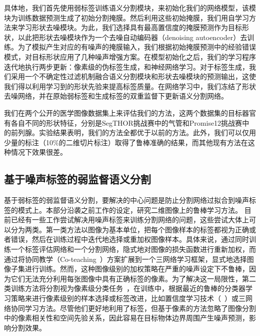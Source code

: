 具体地，我们首先使用弱标签训练语义分割模块，来初始化我们的网络模型，该模块为训练数据预测生成了初始分割掩膜。然后利用这些初始掩膜，我们用自学习方法来学习形状去噪模块。为此，我们选择具有最高置信度的掩膜预测作为目标形状，以此把形状去噪模块作为一个去噪自动编码器（denoising autoencoder）去训练\citep{vincent2010stacked,Sundermeyer_2018_ECCV}。为了模拟产生对应的有噪声的掩膜输入，我们根据初始掩膜预测中的经验错误模式，对目标形状应用了几种噪声增强方案。在模型初始化之后，我们的学习程序迭代地执行两步更新：像素级的伪标签生成，和神经网络学习。对于标签生成，我们采用一个不确定性过滤机制融合语义分割模块和形状去噪模块的预测输出，这使我们得以利用学习到的形状先验来提高标签质量。在网络学习中，我们冻结了形状去噪网络，并在原始弱标签和生成标签的双重监督下更新语义分割网络。

我们在两个公开的医学图像数据集上来评估我们的方法，这两个数据集的目标器官有各自不同的形状特征，分别是SegTHOR挑战赛\citep{trullo2019multiorgan}中的气管和Promise12挑战赛\citep{Litjens2014EvaluationOP}中的前列腺。实验结果表明，我们的方法全都优于以前的方法。此外，我们可以仅用少量的标注（10\%的二维切片标注）取得了鲁棒准确的结果，而其他现有方法在这种情况下效果很差。

\subsection{基于噪声标签的弱监督语义分割}
基于弱标签的弱监督语义分割，要解决的中心问题是防止分割网络过拟合到噪声标签的模式上。本部分沿袭之前工作的设定，研究二维图像上的鲁棒学习方法。
目前已经有一些工作尝试解决用噪声标签来训练分割网络的问题，这些尝试大体上可以分为两类。第一类方法以图像为基本单位，把每个图像样本的标签都视为正确或者错误，然后在训练过程中迭代地选择或重加权图像样本\citep{Zhu2019PickandLearnAQ,Xue2020CascadedRL}。具体来说，\citet{Zhu2019PickandLearnAQ}通过同时训练一个标签评估网络和一个分割网络，隐式地对图像的损失函数进行重新加权，而\citet{Xue2020CascadedRL}通过将协同教学（Co-teaching~\cite{Han2018CoteachingRT}）方案扩展到一个三网络学习框架，显式地选择图像子集进行训练。然而，这种图像级别的加权策略在严重的噪声设定下不鲁棒，因为它们无法充分利用每张图像中具有正确标签的像素。为了解决这一局限性，第二类训练方法将分割视为像素级分类任务~\citet{Zhang2020CharacterizingLE,Zhang2020RobustMI}，在训练中，根据最近的鲁棒的分类器学习策略来进行像素级别的样本选择或标签改进，比如置信度学习技术（~\cite{Zhang2020CharacterizingLE}）或三网络协同学习方法\citep{Zhang2020RobustMI}。尽管他们更好地利用了标签，但基于像素的方法忽略了图像分割中的像素相关性和空间先验关系，因此容易在目标物体边界周围产生噪声预测，影响分割效果。

